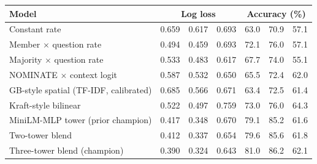 \begin{tabular}{lcccccc}
\toprule
Model & \multicolumn{3}{c}{Log loss} & \multicolumn{3}{c}{Accuracy (\%)} \\
\midrule
Constant rate & 0.659 & 0.617 & 0.693 & 63.0 & 70.9 & 57.1 \\
Member $\times$ question rate & 0.494 & 0.459 & 0.693 & 72.1 & 76.0 & 57.1 \\
Majority $\times$ question rate & 0.533 & 0.483 & 0.617 & 67.7 & 74.0 & 55.1 \\
NOMINATE $\times$ context logit & 0.587 & 0.532 & 0.650 & 65.5 & 72.4 & 62.0 \\
GB-style spatial (TF-IDF, calibrated) & 0.685 & 0.566 & 0.671 & 63.4 & 72.5 & 61.4 \\
Kraft-style bilinear & 0.522 & 0.497 & 0.759 & 73.0 & 76.0 & 64.3 \\
MiniLM-MLP tower (prior champion) & 0.417 & 0.348 & 0.670 & 79.1 & 85.2 & 61.6 \\
Two-tower blend & 0.412 & 0.337 & 0.654 & 79.6 & 85.6 & 61.8 \\
Three-tower blend (champion) & 0.390 & 0.324 & 0.643 & 81.0 & 86.2 & 62.1 \\
\bottomrule
\end{tabular}
